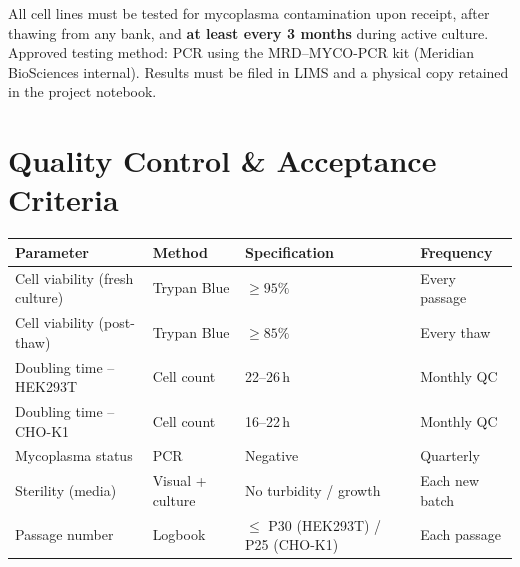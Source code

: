 \vspace{8pt}

\begin{tcolorbox}[infobox, title=\faMicroscope\enspace Mycoplasma Testing Schedule]
  All cell lines must be tested for mycoplasma contamination upon receipt, after thawing from
  any bank, and \textbf{at least every 3 months} during active culture. Approved testing method:
  PCR using the MRD--MYCO-PCR kit (Meridian BioSciences internal). Results must be filed in
  LIMS and a physical copy retained in the project notebook.
\end{tcolorbox}

\vspace{6pt}

\section{Quality Control \& Acceptance Criteria}

\begin{tabularx}{\linewidth}{L{4.8cm} L{3cm} L{3cm} X}
\toprule
{}
\textbf{Parameter} & \textbf{Method} & \textbf{Specification} & \textbf{Frequency} \\
\midrule
Cell viability (fresh culture) & Trypan Blue & $\geq 95\%$ & Every passage \\
Cell viability (post-thaw) & Trypan Blue & $\geq 85\%$ & Every thaw \\
Doubling time -- HEK293T & Cell count & 22--26\,h & Monthly QC \\
Doubling time -- CHO-K1 & Cell count & 16--22\,h & Monthly QC \\
Mycoplasma status & PCR & Negative & Quarterly \\
Sterility (media) & Visual + culture & No turbidity / growth & Each new batch \\
Passage number & Logbook & $\leq$ P30 (HEK293T) / P25 (CHO-K1) & Each passage \\
\bottomrule
\end{tabularx}

\vspace{12pt}

\printbibliography[title={References \& Supporting Documents}]

\vspace{6pt}


